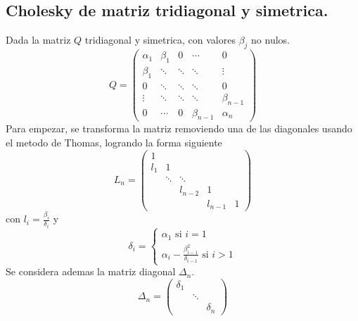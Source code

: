 \documentclass{endm}
\begin{document}
\subsection{Cholesky de matriz tridiagonal y simetrica.}
Dada la matriz $Q$ tridiagonal y simetrica, con valores $\beta_j$ no nulos.
    \begin{equation*}
        Q = \begin{pmatrix} 
                \alpha_1 & \beta_1 &    0   & \cdots      &   0         \\ 
                \beta_1  & \ddots  & \ddots & \ddots      & \vdots      \\
                  0      & \ddots  & \ddots & \ddots      &   0         \\
                \vdots   & \ddots  & \ddots & \ddots      & \beta_{n-1} \\
                  0      & \cdots  &    0   & \beta_{n-1} & \alpha_n
            \end{pmatrix}
    \end{equation*}
Para empezar, se transforma la matriz removiendo una de las diagonales usando el metodo de Thomas, logrando la forma siguiente
    \begin{equation*}
        L_{n} = \begin{pmatrix} 
                1   &        &         &         &   \\ 
                l_1 &   1    &         &         &   \\
                    & \ddots & \ddots  &         &   \\
                    &        & l_{n-2} &    1    &   \\
                    &        &         & l_{n-1} & 1
            \end{pmatrix}
    \end{equation*}
con  $l_i = \frac{\beta_i}{\delta_i}$ y
\begin{equation}
    \delta_i =
        \begin{cases}
            \alpha_1 \text{ si } i = 1 \\
            \alpha_i - \frac{\beta_{i-1}^2}{\delta_{i-1}} \text{ si } i>1
        \end{cases}
\end{equation}
Se considera ademas la matriz diagonal $\Delta_n$.
\begin{equation*}
    \Delta_n = \begin{pmatrix} 
            \delta_1 &        &          \\ 
                        & \ddots &          \\
                        &        & \delta_n
        \end{pmatrix}
\end{equation*}
\end{document}
